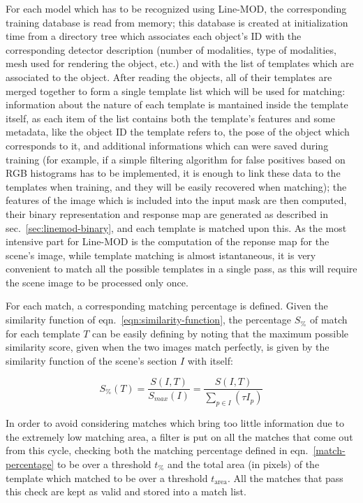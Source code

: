 For each model which has to be recognized using Line-MOD, the
corresponding training database is read from memory; this database
is created at initialization time from a directory tree which
associates each object's ID with the corresponding detector
description (number of modalities, type of modalities, mesh used for
rendering the object, etc.) and with the list of templates which are
associated to the object. After reading the objects, all of their
templates are merged together to form a single template list which
will be used for matching: information about the nature of each
template is mantained inside the template itself, as each item of the
list contains both the template's features and some metadata, like the
object ID the template refers to, the pose of the object which
corresponds to it, and additional informations which can were saved
during training (for example, if a simple filtering algorithm for false
positives  based on RGB histograms has to be implemented, it is enough
to link these data to the templates when training, and they will be
easily recovered when matching); the features of the image which is
included into the input mask are then computed, their binary
representation and response map are generated as described in
sec.~\ref{sec:linemod-binary}, and each template is matched upon
this. As the most intensive part for Line-MOD is the computation of
the reponse map for the scene's image, while template matching is
almost istantaneous, it is very convenient to match all the possible
templates in a single pass, as this will require the scene image to be
processed only once.

For each match, a corresponding matching percentage is defined. Given
the similarity function of eqn.~\ref{eqn:similarity-function}, the
percentage $S_\%$ of match for each template $T$ can be easily defining by noting
that the maximum possible similarity score, given when the two
images match perfectly, is given by the similarity function of the
scene's section $I$ with itself:

\begin{equation} \label{eqn:match-percentage}
  S_\%(T) = \frac{S(I,T)}{S_{max}(I)} = \frac{S(I,T)}{\sum_{p \in I}
    \left( \tau I_{p} \right)}
\end{equation}

In order to avoid considering matches which bring too little
information due to the extremely low matching area, a filter is put on
all the matches that come out from this cycle, checking both the
matching percentage defined in eqn.~\ref{match-percentage} to be over
a threshold $t_\%$ and the total area (in pixels) of the template
which matched to be over a threshold $t_{\text{area}}$. All the
matches that pass this check are kept as valid and stored into a
match list.

